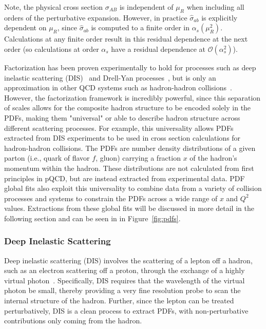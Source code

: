 Note, the physical cross section $\sigma_{AB}$ is independent of $\mu_R$ when including all orders of the perturbative expansion. However, in practice $\hat{\sigma}_{ab}$ is explicitly dependent on $\mu_R$, since $\hat{\sigma}_{ab}$ is computed to a finite order in $\alpha_s(\mu_R^2)$. Calculations at any finite order result in this residual dependence at the next order (so calculations at order $\alpha_s$ have a residual dependence at $\mathcal{O}(\alpha_s^2)$). 

Factorization has been proven experimentally to hold for processes such as deep inelastic scattering (DIS)~\cite{collins_dis} and Drell-Yan processes~\cite{Bodwin:1984hc}, but is only an approximation in other QCD systems such as hadron-hadron collisions~\cite{COLLINS1985104}.
However, the factorization framework is incredibly powerful, since this separation of scales allows for the composite hadron structure to be encoded solely in the PDFs, making them "universal" or able to describe hadron structure across different scattering processes.
For example, this universality allows PDFs extracted from DIS experiments to be used in cross section calculations for hadron-hadron collisions.
The PDFs are number density distributions of a given parton (i.e., quark of flavor $f$, gluon) carrying a fraction $x$ of the hadron's momentum within the hadron.
These distributions are not calculated from first principles in pQCD, but are instead extracted from experimental data.
PDF global fits also exploit this universality to combine data from a variety of collision processes and systems to constrain the PDFs across a wide range of $x$ and $Q^2$ values.
Extractions from these global fits will be discussed in more detail in the following section and can be seen in in Figure~\ref{fig:pdfs}.

\subsubsection{Deep Inelastic Scattering}
Deep inelastic scattering (DIS) involves the scattering of a lepton off a hadron, such as an electron scattering off a proton, through the exchange of a highly virtual photon~\cite{Halzen:1984quarks_leptons}.
Specifically, DIS requires that the wavelength of the virtual photon be small, thereby providing a very fine resolution probe to scan the internal structure of the hadron. 
Further, since the lepton can be treated perturbatively, DIS is a clean process to extract PDFs, with non-perturbative contributions only coming from the hadron.

